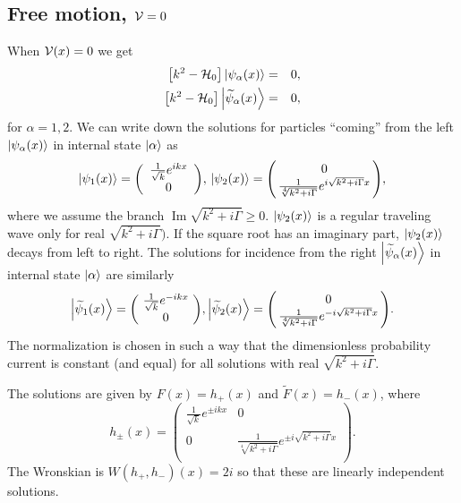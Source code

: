 \subsection{Free motion, ${\cal V}=0$}
%
%
When ${\cal V}(x)=0$ we get
%
\begin{eqnarray}
	\left[k^2-{\cal H}_{0}\right]\ket{\psi_{\alpha}(x)}&=&0,
	\nonumber\\
	\left[k^2-{\cal H}_{0}\right]\ket{\widetilde{\psi}_{\alpha}(x)}&=&0,
\end{eqnarray}
%
for $\alpha=1,2$.
We can write down the solutions for particles ``coming'' from the left $\ket{\psi_{\alpha}(x)}$ in  internal state $\ket{\alpha}$ as
%
\begin{eqnarray}
	\ket{\psi_{1}(x)} = \left(\begin{array}{c}
	\frac{1}{\sqrt{k}} e^{i k x}\\
	0
	\end{array}\right)\!,
	\,
	\ket{\psi_{2}(x)} = \left(\!\!\begin{array}{c}
	0\\
	\frac{1}{\sqrt[4]{k^2+i \Gamma}} e^{i \sqrt{k^2+i \Gamma}x}
	\end{array}\!\!\right)\!,
	\nonumber
\end{eqnarray}
%
where we assume the branch $\operatorname{Im} \sqrt{k^2+i \Gamma}\ge 0$.
$\ket{\psi_2(x)}$ is a regular traveling wave only for real $\sqrt{k^2+i\Gamma})$. If the square root has an imaginary part,  $\ket{\psi_2(x)}$  decays  from left to right.
%
The solutions for incidence from the right  $\ket{\widetilde{\psi}_{\alpha}(x)}$ in internal state $\ket{\alpha}$ are similarly
%
\begin{eqnarray}
	\ket{\widetilde{\psi}_{1}(x)} = \left(\!\begin{array}{c}
	\frac{1}{\sqrt{k}} e^{-i k x}\\
	0
	\end{array}\!\right)\!,
	\ket{\widetilde{\psi}_{2}(x)} = \left(\!\!\begin{array}{c}
	0\\
	\frac{1}{\sqrt[4]{k^2+i \Gamma}} e^{-i \sqrt{k^2+i \Gamma}x}
	\end{array}\!\!\right)\!.
	\nonumber
\end{eqnarray}
%
The normalization is chosen in such a way that the dimensionless probability current
is constant (and equal) for all solutions with real $\sqrt{k^2+i\Gamma}$.


The solutions are given by $F(x) = h_+ (x)$ and $\widetilde F (x) = h_- (x)$, where
%
\begin{equation}
	h_{\pm}(x)=\left(\begin{array}{cc}
	\frac{1}{\sqrt{k}}e^{\pm i k x} & 0\\
	0 & \frac{1}{\sqrt[4]{k^2+i \Gamma}} e^{\pm i \sqrt{k^2+i \Gamma} x} \\
	\end{array}\right).
\end{equation}
%
The Wronskian is $W(h_{+},h_{-})(x)=2i$ so that these are linearly independent solutions.


